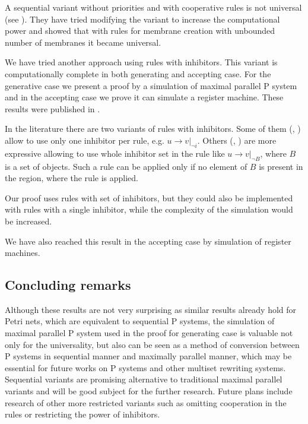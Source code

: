  A sequential variant without priorities and with cooperative rules is not universal (see \cite{Ibarra04dang}). They have tried modifying the variant to increase the computational power and showed that with rules for membrane creation with unbounded number of membranes it became universal.

We have tried another approach using rules with inhibitors. This variant is computationally complete in both generating and accepting case. For the generative case we present a proof by a simulation of maximal parallel P system and in the accepting case we prove it can simulate a register machine. These results were published in \cite{Kovac14Inhibitors}.

In the literature there are two variants of  rules with inhibitors.
Some of them (\cite{Ionescu:jucs_10_5:on_p_systems_with}, \cite{Sburlan05dragos}) allow to use only one inhibitor per rule, e.g. $u\rightarrow v|_{\neg i}$.
Others (\cite{Agrigoroaiei:2010:Dissolution}, \cite{Sburlan:2006:FurtherResultsPromotersInhibitors}) are more expressive allowing to use whole inhibitor set in the rule like $u\rightarrow v|_{\neg B}$, where $B$ is a set of objects. Such a rule can be applied only if no element of $B$ is present in the region, where the rule is applied.

Our proof uses rules with set of inhibitors, but they could also be implemented with rules with a single inhibitor, while the complexity of the simulation would be increased. 



We have also reached this result in the accepting case by simulation of  register machines.



\subsection{Concluding remarks} %
\label{sub:concluding_remarks_of_inhibitors}

Although these results are not very surprising as similar results already hold for Petri nets, which are equivalent to sequential P systems, the simulation of maximal parallel P system used in the proof for generating case is valuable not only for the universality, but also can be seen as a method of conversion between P systems in sequential manner and maximally parallel manner, which may be essential for future works on P systems and other multiset rewriting systems. Sequential variants are promising alternative to traditional maximal parallel variants and will be good subject for the further research. Future plans include research of other more restricted variants such as omitting cooperation in the rules or restricting the power of inhibitors.

